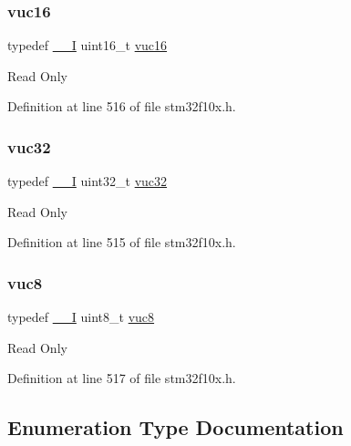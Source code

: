 \subsubsection{\texorpdfstring{vuc16}{vuc16}}
{\footnotesize\ttfamily typedef \hyperlink{core__sc300_8h_af63697ed9952cc71e1225efe205f6cd3}{\+\_\+\+\_\+I} uint16\+\_\+t \hyperlink{group___exported__types_ga7f6037565f0caa27727c8b871daf0d56}{vuc16}}

Read Only 

Definition at line 516 of file stm32f10x.\+h.

\mbox{\label{group___exported__types_ga2e08e321a35a55e72c5b3a507e76371f}} 
\subsubsection{\texorpdfstring{vuc32}{vuc32}}
{\footnotesize\ttfamily typedef \hyperlink{core__sc300_8h_af63697ed9952cc71e1225efe205f6cd3}{\+\_\+\+\_\+I} uint32\+\_\+t \hyperlink{group___exported__types_ga2e08e321a35a55e72c5b3a507e76371f}{vuc32}}

Read Only 

Definition at line 515 of file stm32f10x.\+h.

\mbox{\label{group___exported__types_gab0ec90ac9b2c5864755998c8d37c264a}} 
\subsubsection{\texorpdfstring{vuc8}{vuc8}}
{\footnotesize\ttfamily typedef \hyperlink{core__sc300_8h_af63697ed9952cc71e1225efe205f6cd3}{\+\_\+\+\_\+I} uint8\+\_\+t \hyperlink{group___exported__types_gab0ec90ac9b2c5864755998c8d37c264a}{vuc8}}

Read Only 

Definition at line 517 of file stm32f10x.\+h.



\subsection{Enumeration Type Documentation}
\mbox{\label{group___exported__types_ga8333b96c67f83cba354b3407fcbb6ee8}} 
